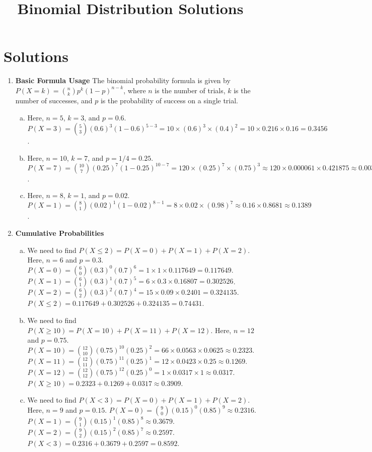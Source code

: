 \documentclass{article}
\begin{document}
\title{Binomial Distribution Solutions}
\author{}
\date{}
\maketitle

\section*{Solutions}

\begin{enumerate}
    \item \textbf{Basic Formula Usage}
    The binomial probability formula is given by $P(X=k) = \binom{n}{k} p^k (1-p)^{n-k}$, where $n$ is the number of trials, $k$ is the number of successes, and $p$ is the probability of success on a single trial.
    \begin{enumerate}[a)]
        \item Here, $n=5$, $k=3$, and $p=0.6$.
        $P(X=3) = \binom{5}{3} (0.6)^3 (1-0.6)^{5-3} = 10 \times (0.6)^3 \times (0.4)^2 = 10 \times 0.216 \times 0.16 = 0.3456$.
        \item Here, $n=10$, $k=7$, and $p=1/4 = 0.25$.
        $P(X=7) = \binom{10}{7} (0.25)^7 (1-0.25)^{10-7} = 120 \times (0.25)^7 \times (0.75)^3 \approx 120 \times 0.000061 \times 0.421875 \approx 0.00309$.
        \item Here, $n=8$, $k=1$, and $p=0.02$.
        $P(X=1) = \binom{8}{1} (0.02)^1 (1-0.02)^{8-1} = 8 \times 0.02 \times (0.98)^7 \approx 0.16 \times 0.8681 \approx 0.1389$.
    \end{enumerate}

    \item \textbf{Cumulative Probabilities}
    \begin{enumerate}[a)]
        \item We need to find $P(X \le 2) = P(X=0) + P(X=1) + P(X=2)$. Here, $n=6$ and $p=0.3$.
        $P(X=0) = \binom{6}{0} (0.3)^0 (0.7)^6 = 1 \times 1 \times 0.117649 = 0.117649$.
        $P(X=1) = \binom{6}{1} (0.3)^1 (0.7)^5 = 6 \times 0.3 \times 0.16807 = 0.302526$.
        $P(X=2) = \binom{6}{2} (0.3)^2 (0.7)^4 = 15 \times 0.09 \times 0.2401 = 0.324135$.
        $P(X \le 2) = 0.117649 + 0.302526 + 0.324135 = 0.74431$.
        \item We need to find $P(X \ge 10) = P(X=10) + P(X=11) + P(X=12)$. Here, $n=12$ and $p=0.75$.
        $P(X=10) = \binom{12}{10} (0.75)^{10} (0.25)^2 = 66 \times 0.0563 \times 0.0625 \approx 0.2323$.
        $P(X=11) = \binom{12}{11} (0.75)^{11} (0.25)^1 = 12 \times 0.0423 \times 0.25 \approx 0.1269$.
        $P(X=12) = \binom{12}{12} (0.75)^{12} (0.25)^0 = 1 \times 0.0317 \times 1 \approx 0.0317$.
        $P(X \ge 10) = 0.2323 + 0.1269 + 0.0317 \approx 0.3909$.
        \item We need to find $P(X < 3) = P(X=0) + P(X=1) + P(X=2)$. Here, $n=9$ and $p=0.15$.
        $P(X=0) = \binom{9}{0} (0.15)^0 (0.85)^9 \approx 0.2316$.
        $P(X=1) = \binom{9}{1} (0.15)^1 (0.85)^8 \approx 0.3679$.
        $P(X=2) = \binom{9}{2} (0.15)^2 (0.85)^7 \approx 0.2597$.
        $P(X < 3) = 0.2316 + 0.3679 + 0.2597 = 0.8592$.
    \end{enumerate}


\end{enumerate}
\end{document}

